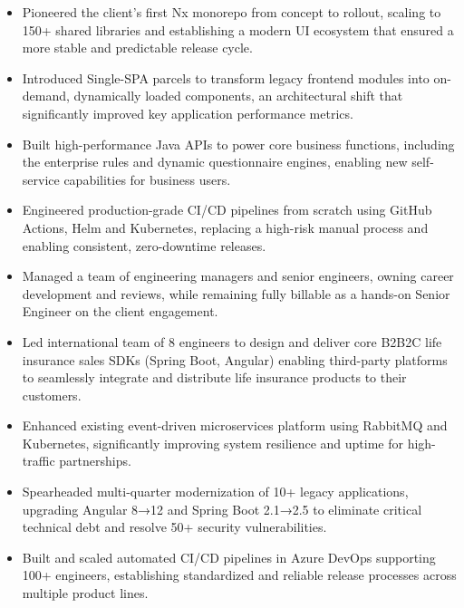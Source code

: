 \begin{itemize}[leftmargin=*, itemsep=\bulletItemSeparation, topsep=0pt]
    \item Pioneered the client's first Nx monorepo from concept to rollout, scaling to 150+ shared libraries and establishing a modern UI ecosystem that ensured a more stable and predictable release cycle.
    \item Introduced Single-SPA parcels to transform legacy frontend modules into on-demand, dynamically loaded components, an architectural shift that significantly improved key application performance metrics.
    \item Built high-performance Java APIs to power core business functions, including the enterprise rules and dynamic questionnaire engines, enabling new self-service capabilities for business users.
    \item Engineered production-grade CI/CD pipelines from scratch using GitHub Actions, Helm and Kubernetes, replacing a high-risk manual process and enabling consistent, zero-downtime releases.
    \item Managed a team of engineering managers and senior engineers, owning career development and reviews, while remaining fully billable as a hands-on Senior Engineer on the client engagement.
\end{itemize}
\vspace{\spacingBetweenJobs}

\begin{itemize}[leftmargin=*, itemsep=\bulletItemSeparation, topsep=0pt]
    \item Led international team of 8 engineers to design and deliver core B2B2C life insurance sales SDKs (Spring Boot, Angular) enabling third-party platforms to seamlessly integrate and distribute life insurance products to their customers.
    \item Enhanced existing event-driven microservices platform using RabbitMQ and Kubernetes, significantly improving system resilience and uptime for high-traffic partnerships.
    \item Spearheaded multi-quarter modernization of 10+ legacy applications, upgrading Angular 8→12 and Spring Boot 2.1→2.5 to eliminate critical technical debt and resolve 50+ security vulnerabilities.
    \item Built and scaled automated CI/CD pipelines in Azure DevOps supporting 100+ engineers, establishing standardized and reliable release processes across multiple product lines.
\end{itemize}
\vspace{\spacingBetweenJobs}

